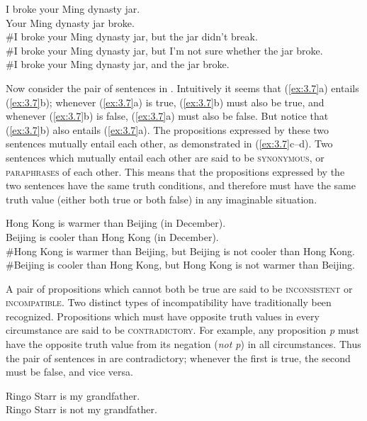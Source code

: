 \ea \label{ex:3.6}
\ea I broke your Ming dynasty jar.\\
\ex Your Ming dynasty jar broke.\\
\ex \#I broke your Ming dynasty jar, but the jar didn’t break.\\
\ex \#I broke your Ming dynasty jar, but I’m not sure whether the jar broke.\\
\ex \#I broke your Ming dynasty jar, and the jar broke.
                       \z
\z


Now consider the pair of sentences in . Intuitively it seems that (\ref{ex:3.7}a) entails (\ref{ex:3.7}b); whenever (\ref{ex:3.7}a) is true, (\ref{ex:3.7}b) must also be true, and whenever (\ref{ex:3.7}b) is false, (\ref{ex:3.7}a) must also be false. But notice that (\ref{ex:3.7}b) also entails (\ref{ex:3.7}a). The propositions expressed by these two sentences mutually entail each other, as demonstrated in (\ref{ex:3.7}c--d). Two sentences which mutually entail each other are said to be \textsc{synonymous}, or \textsc{paraphrases} of each other. This means that the propositions expressed by the two sentences have the same truth conditions, and therefore must have the same truth value (either both true or both false) in any imaginable situation.


\ea \label{ex:3.7}
\ea Hong Kong is warmer than Beijing (in December).\\
\ex Beijing is cooler than Hong Kong (in December).\\
\ex \#Hong Kong is warmer than Beijing, but Beijing is not cooler than Hong Kong.\\
\ex \#Beijing is cooler than Hong Kong, but Hong Kong is not warmer than Beijing.
                       \z
\z


A pair of propositions which cannot both be true are said to be \textsc{inconsistent} or \textsc{incompatible}. Two distinct types of incompatibility have traditionally been recognized. Propositions which must have opposite truth values in every circumstance are said to be \textsc{contradictory}. For example, any proposition \textit{p} must have the opposite truth value from its negation (\textit{not p}) in all circumstances. Thus the pair of sentences in  are contradictory; whenever the first is true, the second must be false, and vice versa.


\ea \label{ex:3.8}
\ea Ringo Starr is my grandfather.\\
\ex Ringo Starr is not my grandfather.
                       \z
\z


